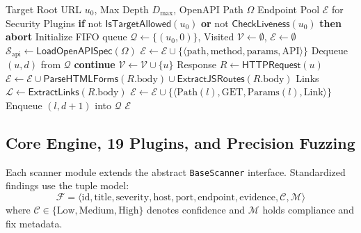 \documentclass[conference]{IEEEtran}
\begin{document}
\begin{algorithm}[t]
\small
\caption{Attack Surface Discovery and Endpoint Seeding}
\label{alg:crawling}
\begin{algorithmic}[1]
\REQUIRE Target Root URL $u_0$, Max Depth $D_{\max}$, OpenAPI Path $\Omega$
\ENSURE Endpoint Pool $\mathcal{E}$ for Security Plugins
\STATE \textbf{if} not $\textsf{IsTargetAllowed}(u_0)$ \textbf{or} not $\textsf{CheckLiveness}(u_0)$ \textbf{then abort}
\STATE Initialize FIFO queue $\mathcal{Q} \leftarrow \{(u_0, 0)\}$, Visited $\mathcal{V} \leftarrow \emptyset$, $\mathcal{E} \leftarrow \emptyset$
\IF{$\Omega \neq \emptyset$}
    \STATE $\mathcal{S}_{\text{api}} \leftarrow \textsf{LoadOpenAPISpec}(\Omega)$
        \STATE $\mathcal{E} \leftarrow \mathcal{E} \cup \{\langle \text{path}, \text{method}, \text{params}, \text{API} \rangle\}$
    \ENDFOR
\ENDIF
{}
    \STATE Dequeue $(u, d)$ from $\mathcal{Q}$
        \STATE \textbf{continue}
    \ENDIF
    \STATE $\mathcal{V} \leftarrow \mathcal{V} \cup \{u\}$
    \STATE Response $R \leftarrow \textsf{HTTPRequest}(u)$
    \STATE $\mathcal{E} \leftarrow \mathcal{E} \cup \textsf{ParseHTMLForms}(R.\text{body}) \cup \textsf{ExtractJSRoutes}(R.\text{body})$
    \STATE Links $\mathcal{L} \leftarrow \textsf{ExtractLinks}(R.\text{body})$
            \STATE $\mathcal{E} \leftarrow \mathcal{E} \cup \{\langle \text{Path}(l), \text{GET}, \text{Params}(l), \text{Link} \rangle\}$
        \ENDIF
        \STATE Enqueue $(l, d+1)$ into $\mathcal{Q}$
    \ENDFOR
\ENDWHILE
\RETURN $\mathcal{E}$
\end{algorithmic}
\end{algorithm}

\subsection{Core Engine, 19 Plugins, and Precision Fuzzing}
Each scanner module extends the abstract \texttt{BaseScanner} interface. Standardized findings use the tuple model:
\begin{equation}
\mathcal{F} = \langle \text{id}, \text{title}, \text{severity}, \text{host}, \text{port}, \text{endpoint}, \text{evidence}, \mathcal{C}, \mathcal{M} \rangle
\end{equation}
where $\mathcal{C} \in \{\text{Low}, \text{Medium}, \text{High}\}$ denotes confidence and $\mathcal{M}$ holds compliance and fix metadata.
\end{document}
